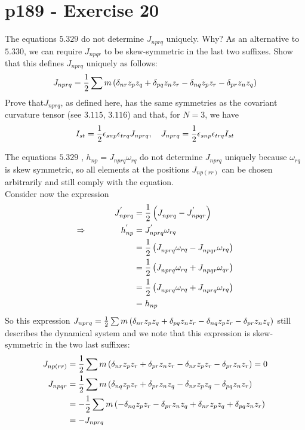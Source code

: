 \section{p189 - Exercise 20}
\begin{tcolorbox}
The equations $\mathbf{5.329}$ do not determine $J_{nprq}$ uniquely. Why? As an alternative to $\mathbf{5.330}$, we can require $J_{npqr}$ to be skew-symmetric in the last two suffixes. Show that this defines $J_{nprq}$ uniquely as follows:
$$J_{nprq}= \frac{1}{2}\sum m \left(\delta_{nr}z_pz_q +\delta_{pq}z_nz_r-\delta_{nq}z_pz_r-\delta_{pr}z_nz_q \right)$$
Prove that$J_{nprq}$, as defined here, has the same symmetries as the covariant curvature tensor (see  $\mathbf{3.115}$, $\mathbf{3.116}$) and that, for $N=3$, we have
$$ I_{st} = \frac{1}{2}\epsilon_{snp}\epsilon_{trq}J_{nprq}, \quad  J_{nprq}=  \frac{1}{2}\epsilon_{snp}\epsilon_{trq} I_{st}$$
\end{tcolorbox} 
The equations $\mathbf{5.329}$ , $h_{np}=J_{nprq}\omega_{rq}$ do not determine $J_{nprq}$ uniquely because $\omega_{rq}$ is skew symmetric, so all elements at the positions $J_{np(rr)}$ can be chosen arbitrarily and still comply with the equation.\\
Consider now the expression
\begin{align}
J^{'}_{nprq}&= \frac{1}{2}\left(  J^{}_{nprq}-J^{'}_{npqr}\right)\\
\Rightarrow \quad\quad\quad\quad h^{'}_{np}&=J^{'}_{nprq}\omega_{rq}\\
&=  \frac{1}{2}\left(  J^{}_{nprq}\omega_{rq}-J^{}_{npqr}\omega_{rq}\right)\\
&= \frac{1}{2}\left(  J^{}_{nprq}\omega_{rq}+J^{}_{npqr}\omega_{qr}\right)\\
&= \frac{1}{2}\left(  J^{}_{nprq}\omega_{rq}+J^{}_{nprq}\omega_{rq}\right)\\
&=h_{np}
\end{align}
So this expression $J_{nprq}= \frac{1}{2}\sum m \left(\delta_{nr}z_pz_q +\delta_{pq}z_nz_r-\delta_{nq}z_pz_r-\delta_{pr}z_nz_q \right)$ still describes the dynamical system and we note that this expression is skew-symmetric in the two last suffixes:
\begin{align}
J_{np(rr)}&= \frac{1}{2}\sum m \left(\delta_{nr}z_pz_r +\delta_{pr}z_nz_r-\delta_{nr}z_pz_r-\delta_{pr}z_nz_r \right)=0\\
J_{npqr}&= \frac{1}{2}\sum m \left(\delta_{nq}z_pz_r +\delta_{pr}z_nz_q-\delta_{nr}z_pz_q-\delta_{pq}z_nz_r \right)\\
&=-\frac{1}{2}\sum m \left(-\delta_{nq}z_pz_r -\delta_{pr}z_nz_q+\delta_{nr}z_pz_q+\delta_{pq}z_nz_r \right)\\
&= - J_{nprq}
\end{align}

